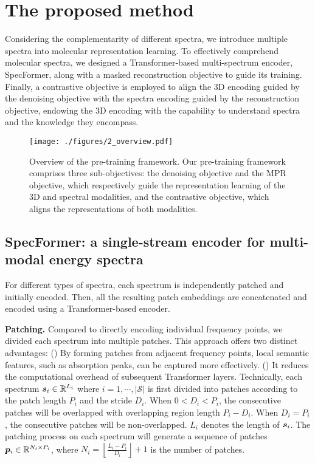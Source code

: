 \section{The proposed \themodel method}

Considering the complementarity of different spectra, we introduce multiple spectra into molecular representation learning. To effectively comprehend molecular spectra, we designed a Transformer-based multi-spectrum encoder, SpecFormer, along with a masked reconstruction objective to guide its training. Finally, a contrastive objective is employed to align the 3D encoding guided by the denoising objective with the spectra encoding guided by the reconstruction objective, endowing the 3D encoding with the capability to understand spectra and the knowledge they encompass.

\begin{figure}
\begin{center}
\texttt{[image: ./figures/2\_overview.pdf]}
\end{center}
\caption{Overview of the \themodel pre-training framework. Our pre-training framework comprises three sub-objectives: the denoising objective and the MPR objective, which respectively guide the representation learning of the 3D and spectral modalities, and the contrastive objective, which aligns the representations of both modalities.}
\label{fig:overview}
\end{figure}

\subsection{SpecFormer: a single-stream encoder for multi-modal energy spectra}\label{sec:specformer}

For different types of spectra, each spectrum is independently patched and initially encoded. Then, all the resulting patch embeddings are concatenated and encoded using a Transformer-based encoder.

\textbf{Patching.}
Compared to directly encoding individual frequency points, we divided each spectrum into multiple patches. This approach offers two distinct advantages: () By forming patches from adjacent frequency points, local semantic features, such as absorption peaks, can be captured more effectively. () It reduces the computational overhead of subsequent Transformer layers.
Technically, each spectrum ${\bm{s}}_i \in \mathbb{R}^{L_i}$ where $i=1,\cdots,|\mathcal{S}|$ is first divided into patches according to the patch length $P_i$ and the stride $D_i$. When $0<D_i<P_i$, the consecutive patches will be overlapped with overlapping region length $P_i-D_i$. When $D_i=P_i$, the consecutive patches will be non-overlapped. $L_i$ denotes the length of ${\bm{s}}_i$. The patching process on each spectrum will generate a sequence of patches ${\bm{p}}_i \in \mathbb{R}^{N_i\times P_i}$, where $N_i = \left\lfloor \frac{L_i - P_i}{D_i} \right\rfloor + 1$ is the number of patches.


